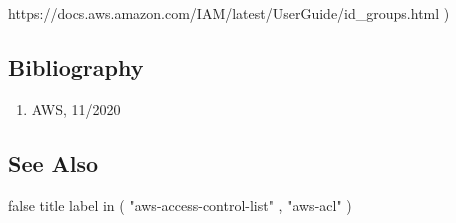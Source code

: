 https://docs.aws.amazon.com/IAM/latest/UserGuide/id\_groups.html  )  \subsection*{Bibliography } \begin{enumerate} \item  AWS, 11/2020    \end{enumerate} \subsection*{See Also } false  title  label in ( "aws-access-control-list" , "aws-acl" )  